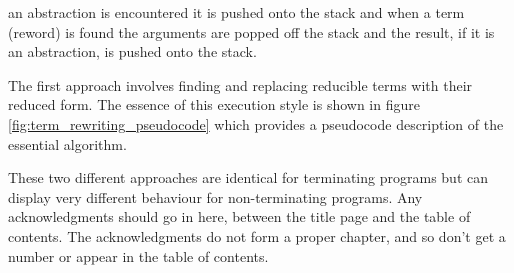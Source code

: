 an abstraction is
encountered it is pushed onto the stack and when a term (reword)
is found the arguments are popped off the stack and the 
result, if it is an abstraction, is pushed onto the stack.

The first approach involves finding and replacing
reducible terms with their reduced form. The essence of this
execution style is shown in figure 
\ref{fig:term_rewriting_pseudocode} which provides a pseudocode
description of the essential algorithm.

These two different approaches are identical for
terminating programs but can display very different behaviour
for non-terminating programs.
Any acknowledgments should go 
in here, between the title page and the table of contents.  The 
acknowledgments do not form a proper chapter, and so don't get a 
number or appear in the table of contents.
